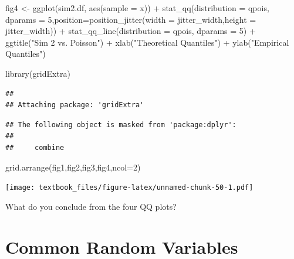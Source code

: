 \documentclass[
  11pt,
]{book}
\newenvironment{Shaded}{\begin{snugshade}}{\end{snugshade}}
\newcommand{\AttributeTok}[1]{\textcolor[rgb]{0.77,0.63,0.00}{#1}}
\newcommand{\DecValTok}[1]{\textcolor[rgb]{0.00,0.00,0.81}{#1}}
\newcommand{\FunctionTok}[1]{\textcolor[rgb]{0.00,0.00,0.00}{#1}}
\newcommand{\NormalTok}[1]{#1}
\newcommand{\OtherTok}[1]{\textcolor[rgb]{0.56,0.35,0.01}{#1}}
\newcommand{\SpecialCharTok}[1]{\textcolor[rgb]{0.00,0.00,0.00}{#1}}
\newcommand{\StringTok}[1]{\textcolor[rgb]{0.31,0.60,0.02}{#1}}
\theoremstyle{definition}
\theoremstyle{definition}
\theoremstyle{definition}
\theoremstyle{definition}
\theoremstyle{remark}
\begin{document}
\begin{Shaded}
\begin{Highlighting}[]
\NormalTok{fig4 }\OtherTok{\textless{}{-}} \FunctionTok{ggplot}\NormalTok{(sim2.df, }\FunctionTok{aes}\NormalTok{(}\AttributeTok{sample =}\NormalTok{ x)) }\SpecialCharTok{+}
  \FunctionTok{stat\_qq}\NormalTok{(}\AttributeTok{distribution =}\NormalTok{ qpois, }\AttributeTok{dparams =} \DecValTok{5}\NormalTok{,}\AttributeTok{position=}\FunctionTok{position\_jitter}\NormalTok{(}\AttributeTok{width =}\NormalTok{ jitter\_width,}\AttributeTok{height =}\NormalTok{ jitter\_width)) }\SpecialCharTok{+}
  \FunctionTok{stat\_qq\_line}\NormalTok{(}\AttributeTok{distribution =}\NormalTok{ qpois, }\AttributeTok{dparams =} \DecValTok{5}\NormalTok{) }\SpecialCharTok{+}
  \FunctionTok{ggtitle}\NormalTok{(}\StringTok{"Sim 2 vs. Poisson"}\NormalTok{) }\SpecialCharTok{+}
  \FunctionTok{xlab}\NormalTok{(}\StringTok{"Theoretical Quantiles"}\NormalTok{) }\SpecialCharTok{+}
  \FunctionTok{ylab}\NormalTok{(}\StringTok{"Empirical Quantiles"}\NormalTok{)}
\end{Highlighting}
\end{Shaded}

\newpage

\begin{Shaded}
\begin{Highlighting}[]
\FunctionTok{library}\NormalTok{(gridExtra)}
\end{Highlighting}
\end{Shaded}

\begin{verbatim}
## 
## Attaching package: 'gridExtra'
\end{verbatim}

\begin{verbatim}
## The following object is masked from 'package:dplyr':
## 
##     combine
\end{verbatim}

\begin{Shaded}
\begin{Highlighting}[]
\FunctionTok{grid.arrange}\NormalTok{(fig1,fig2,fig3,fig4,}\AttributeTok{ncol=}\DecValTok{2}\NormalTok{)}
\end{Highlighting}
\end{Shaded}

\texttt{[image: textbook\_files/figure-latex/unnamed-chunk-50-1.pdf]}

What do you conclude from the four QQ plots?

\newpage

\hypertarget{common-random-variables}{%
\section{Common Random Variables}\label{common-random-variables}}
\end{document}
